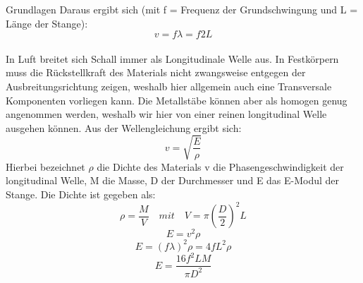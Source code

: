 \documentclass[twoside]{protokoll}
\begin{document}
\begin{aufgabe}{Grundlagen}
    Daraus ergibt sich (mit f = Frequenz der Grundschwingung und L = Länge der Stange): \\
    
    \begin{equation}
        v = f \lambda = f 2 L
    \end{equation}\\

    In Luft breitet sich Schall immer als Longitudinale Welle aus.
    In Festkörpern muss die Rückstellkraft des Materials nicht zwangsweise entgegen der Ausbreitungsrichtung zeigen, weshalb hier allgemein auch eine Transversale Komponenten vorliegen kann.
    Die Metallstäbe können aber als homogen genug angenommen werden, weshalb wir hier von einer reinen longitudinal Welle ausgehen können.
    Aus der Wellengleichung ergibt sich:
    \begin{equation}
         v = \sqrt{\frac{E}{\rho}}
    \end{equation}
Hierbei bezeichnet $\rho$ die Dichte des Materials v die Phasengeschwindigkeit der 
longitudinal Welle, M die Masse, D der Durchmesser und E das E-Modul der Stange. Die Dichte ist gegeben als:
	\begin{equation}
	\rho = \frac{M}{V} \quad  mit \quad V = \pi\left(\frac{D}{2}\right)^2 L
	\end{equation}
    \begin{equation}
         E = v ^2 \rho
    \end{equation}
    \begin{equation}
        E = (f \lambda)^2 \rho = 4 f L ^2 \rho
    \end{equation}
    \begin{equation}
        E = \frac{ 16 f^2 L M}{\pi D ^2}
    \end{equation}

     
\end{aufgabe}
\end{document}
